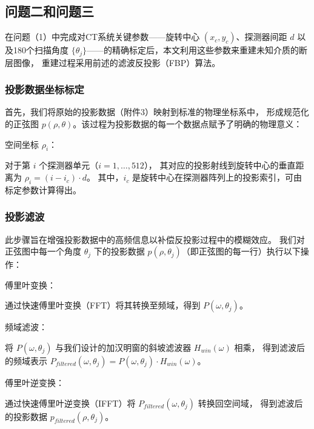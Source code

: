 \subsection{问题二和问题三}
在问题（1）中完成对CT系统关键参数——旋转中心 $(x_c, y_c)$、探测器间距 $d$ 
以及180个扫描角度 $\{\theta_j\}$——的精确标定后，本文利用这些参数来重建未知介质的断层图像，
重建过程采用前述的滤波反投影（FBP）算法。

\subsubsection{投影数据坐标标定}
首先，我们将原始的投影数据（附件3）映射到标准的物理坐标系中，
形成规范化的正弦图 $p(\rho, \theta)$。该过程为投影数据的每一个数据点赋予了明确的物理意义：\par
空间坐标 $\rho_i$：\par
对于第 $i$ 个探测器单元（$i=1, \dots, 512$），
其对应的投影射线到旋转中心的垂直距离为 $\rho_i = (i - i_c) \cdot d$。
其中，$i_c$ 是旋转中心在探测器阵列上的投影索引，可由标定参数计算得出。\par

\subsubsection{投影滤波}
此步骤旨在增强投影数据中的高频信息以补偿反投影过程中的模糊效应。
我们对正弦图中每一个角度 $\theta_j$ 下的投影数据 $p(\rho, \theta_j)$（即正弦图的每一行）执行以下操作：\par
傅里叶变换：\par
通过快速傅里叶变换（FFT）将其转换至频域，得到 $P(\omega, \theta_j)$。\par
频域滤波：\par
将 $P(\omega, \theta_j)$ 与我们设计的加汉明窗的斜坡滤波器 $H_{win}(\omega)$ 相乘，
得到滤波后的频域表示 $P_{filtered}(\omega, \theta_j) = P(\omega, \theta_j) \cdot H_{win}(\omega)$。\par
傅里叶逆变换：\par
通过快速傅里叶逆变换（IFFT）将 $P_{filtered}(\omega, \theta_j)$ 转换回空间域，
得到滤波后的投影数据 $p_{filtered}(\rho, \theta_j)$。\par

